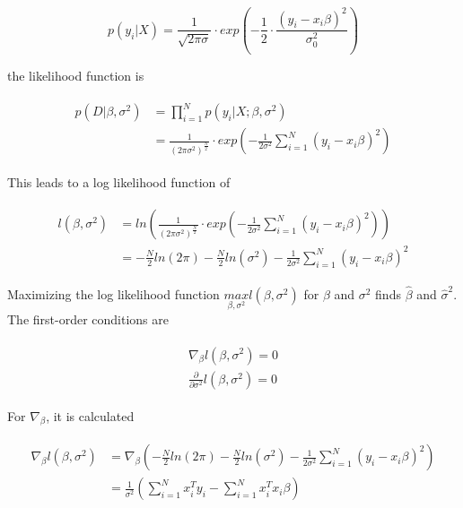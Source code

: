 \documentclass{article}
\begin{document}
\begin{equation}
p(y_i|X) = \frac{1}{\sqrt{2\pi\sigma}} \cdot exp(- \frac{1}{2} \cdot \frac{(y_i - x_i\beta)^2}{\sigma^2_0})
\end{equation}

the likelihood function is

\begin{align}
\begin{aligned}
p(D|\beta, \sigma^2) &= \prod_{i=1}^{N}p(y_i|X;\beta,\sigma^2) \\
				&= \frac{1}{(2\pi\sigma^2)^{\frac{N}{2}}} \cdot exp(-\frac{1}{2\sigma^2}\sum_{i=1}^{N}(y_i-x_i\beta)^2)
\end{aligned}
\end{align}

This leads to a log likelihood function of

\begin{align}
\begin{aligned}
l(\beta, \sigma^2) &= ln (\frac{1}{(2\pi\sigma^2)^{\frac{N}{2}}} \cdot exp(-\frac{1}{2\sigma^2}\sum_{i=1}^{N}(y_i-x_i\beta)^2))\\
			   &= -\frac{N}{2}ln(2\pi) - \frac{N}{2}ln(\sigma^2) - \frac{1}{2\sigma^2}\sum_{i=1}^{N}(y_i - x_i\beta)^2
\end{aligned}
\end{align}

Maximizing the log likelihood function $\underset{\beta,\sigma^2}{max}l(\beta, \sigma^2)$ for $\beta$ and $\sigma^2$ finds $\hat\beta$ and $\hat\sigma^2$. The first-order conditions are

\begin{align}
\begin{aligned}
\nabla_{\beta}l(\beta, \sigma^2) = 0\\
\frac{\partial}{\partial\sigma^2}l(\beta, \sigma^2) = 0
\end{aligned}
\end{align}

For $\nabla_{\beta}$, it is calculated

\begin{align}
\begin{aligned}
\nabla_{\beta}l(\beta, \sigma^2) &= \nabla_{\beta}( -\frac{N}{2}ln(2\pi) - \frac{N}{2}ln(\sigma^2) - \frac{1}{2\sigma^2}\sum_{i=1}^{N}(y_i - x_i\beta)^2)\\
						 &= \frac{1}{\sigma^2}(\sum_{i=1}^{N}x_i^Ty_i - \sum_{i=1}^{N}x_i^Tx_i\beta)
\end{aligned}
\end{align}
\end{document}
